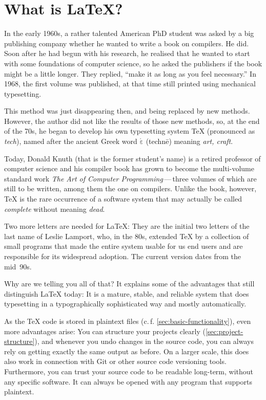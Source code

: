 \chapter{What is \LaTeX?}
\label{sec:what-is-latex}

In the early 1960s, a rather talented American PhD student was asked by a big publishing company whether he wanted to write a book on compilers.
He did.
Soon after he had begun with his research, he realised that he wanted to start with some foundations of computer science, so he asked the publishers if the book might be a little longer.
They replied, \enquote{make it as long as you feel necessary.}
In 1968, the first volume was published, at that time still printed using mechanical typesetting.

This method was just disappearing then, and being replaced by new methods.
However, the author did not like the results of those new methods, so,
at the end of the 70s, he began to develop his own typesetting system \TeX
(pronounced as \emph{tech}), named after the ancient Greek word \texttau$\mathrm{\acute{\varepsilon}}$\textchi\textnu\texteta{} (technē) meaning \emph{art, craft}.

Today, Donald Knuth (that is the former student’s name) is a retired professor of computer science and his compiler book has grown to become the multi-volume standard work \emph{The Art of Computer Programming}\,—\,three volumes of which are still to be written, among them the one on compilers.
Unlike the book, however, \TeX{} is the rare occurrence of a software system that may actually be called \emph{complete} without meaning \emph{dead}.

Two more letters are needed for \LaTeX:
They are the initial two letters of the last name of Leslie Lamport, who, in the 80s, extended \TeX{} by a collection of small programs that made the entire system usable for us end users and are responsible for its widespread adoption.
The current version dates from the mid~90s.

Why are we telling you all of that?
It explains some of the advantages that still distinguish \LaTeX{} today:
It is a mature, stable, and reliable system
that does typesetting in a typographically sophisticated way and mostly automatically.

As the \TeX{} code is stored in plaintext files (c.\,f. \cref{sec:basic-functionality}),
even more advantages arise:
You can structure your projects clearly (\cref{sec:project-structure}),
and whenever you undo changes in the source code, you can always rely on getting exactly the same output as before.
On a larger scale, this does also work in connection with Git or other source code versioning tools.
Furthermore, you can trust your source code to be readable long-term, without any specific software.
It can always be opened with any program that supports plaintext.


